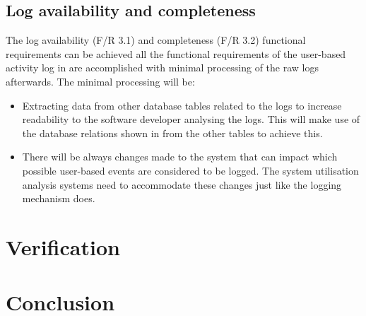 \subsection{Log availability and completeness}\label{sec:ch2_log_Availability}
The log availability (F/R 3.1) and completeness (F/R 3.2) functional requirements can be achieved all the functional requirements of the user-based activity log in  are accomplished with minimal processing of the raw logs afterwards. The minimal processing will be:

\begin{itemize}
	\item Extracting data from other database tables related to the logs to increase readability to the software developer analysing the logs. This will make use of the database relations shown in  from the other tables to achieve this. 
	\item There will be always changes made to the system that can impact which possible user-based events are considered to be logged. The system utilisation analysis systems need to accommodate these changes just like the logging mechanism does. 
\end{itemize}


\section{Verification}

\section{Conclusion}
